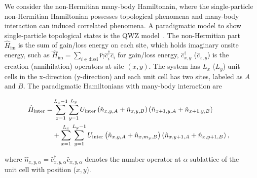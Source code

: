 \documentclass[longbibliography, aps, prx, amsmath, amssymb, amsfonts, twocolumn,superscriptaddress, footinbib]{revtex4-1}
\begin{document}
	We consider the non-Hermitian many-body Hamiltonain, where the single-particle non-Hermitian Hamiltonian possesses topological phenomena and many-body interaction can induced correlated phenomena. 
	A paradigmatic model to show single-particle topological states is the QWZ model~\cite{qi2006topological}. The non-Hermitian part $\hat{H}_{\text{im}}$ is the sum of gain/loss energy on each site, which holds imaginary onsite energy, such as $\hat{H}_{\text{im}} = \sum_{i\in \text{dissi}} \mathrm{i}\tilde{\gamma} \hat{c}_i^{\dagger} \hat{c}_i$ for gain/loss energy, $\hat{c}_{{x}, {y}}^{\dagger}$ ($\hat{c}_{{x}, {y}}$) is the creation (annihilation) operators at site $({x},{y})$.  The system has $L_x$ ($L_y$) unit cells in the x-direction (y-direction) and each unit cell has two sites, labeled as $A$ and $B$. 
	The paradigmatic Hamiltonians with many-body interaction are
	\begin{widetext}
		\begin{align}
			\hat{H}_{\text{inter}} = &\sum_{{x}=1}^{L_{x}-1} \sum_{{y}=1}^{L_{y}}  U_{\text{inter}} \left(\hat{n}_{{x}, {y}, A}+\hat{n}_{{x}, {y}, B}\right) \left(\hat{n}_{{x}+1, {y}, A}+\hat{n}_{{x}+1, {y}, B}\right)\notag\\
			& + 
			\sum_{{x}=1}^{L_{x}} \sum_{{y}=1}^{L_{y}-1}  U_{\text{inter}} \left(\hat{n}_{{x}, {y}, A}+\hat{n}_{{x}, m_y, B}\right) \left(\hat{n}_{{x}, {y}+1, A}+\hat{n}_{{x}, {y}+1, B}\right),\\
		\end{align}
	\end{widetext}
	where $\hat{n}_{{x},{y},\alpha}=\hat{c}_{x,y,\alpha}^{\dagger}\hat{c}_{x,y,\alpha}$ denotes the number operator at $\alpha$ sublattice of the unit cell with position (${x},{y}$). 
\end{document}
